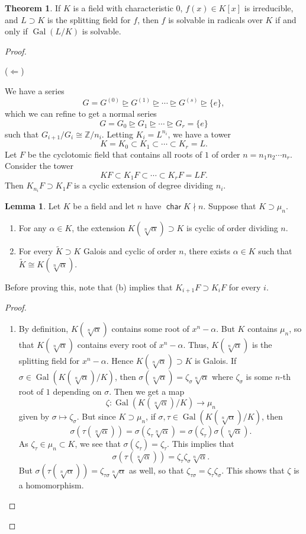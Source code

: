 \documentclass[10pt,letterpaper,cm]{nupset}
\theoremstyle{definition}
\theoremstyle{theorem}
\newtheorem{theorem}[definition]{Theorem}
\newtheorem{lemma}[definition]{Lemma}
\theoremstyle{remark}
\newcommand{\Z}{\mathbb Z}
\newcommand{\1}{\mathbf{1}}
\newcommand{\0}{\vec 0}
\DeclareMathOperator{\Char}{\mathsf{char}}
\DeclareMathOperator{\gal}{Gal}
\begin{document}
\begin{theorem}
If $K$ is a field with characteristic $0$, $f(x) \in K[x]$ is irreducible, and $L \supset K$ is the splitting field for $f$, then  $f$ is solvable in radicals over $K$ if and only if $\gal(L/K)$ is solvable. 
\end{theorem}
\begin{proof} $ $


($\Longleftarrow$) 

We have a series $$ G = G^{(0)} \unrhd G^{(1)} \unrhd \cdots \unrhd G^{(s)} \unrhd \{e\} ,$$ which we can refine to get a normal series $$  G=G_0 \unrhd G_1 \unrhd \cdots \unrhd G_r = \{e\}  $$ such that $G_{i+1}/G_i \cong \Z/n_i$. Letting $K_i = L^{n_i}$, we have a tower $$ K= K_0 \subset K_1 \subset \cdots \subset K_r = L  .$$ Let $F$ be the cyclotomic field that contains all roots of $1$ of order $n= n_1n_2 \cdots n_r$. Consider the tower $$KF \subset K_1F \subset \cdots \subset K_r F = LF.$$  Then $K_{n_i}F \supset K_1F$ is a cyclic extension of degree dividing $n_i$.
\begin{lemma}
Let $K$ be a field and let $n$ have $\Char{K} \nmid n$. Suppose that $K \supset \mu_n$.
\begin{enumerate}[label=(\alph*)]
\item For any $\alpha \in K$, the extension $K(\sqrt[n]{\alpha}) \supset K$  is cyclic of order dividing $n$.
\item For every $\widetilde{K} \supset K$ Galois and cyclic of order $n$, there exists $\alpha \in K$ such that $\widetilde{K} \cong K(\sqrt[n]{\alpha})$.
\end{enumerate}
\end{lemma}
Before proving this, note that (b) implies that $K_{i+1}F \supset K_iF$ for every $i$.
\begin{proof} $ $
\begin{enumerate}[label=(\alph*)]
\item By definition, $K(\sqrt[n]{\alpha})$ contains some root of $x^n - \alpha$. But $K$ contains $\mu_n$, so that $K(\sqrt[n]{\alpha})$ contains every root of $x^n - \alpha$. Thus, $K(\sqrt[n]{\alpha})$ is the splitting field for $x^n - \alpha$. Hence $K(\sqrt[n]{\alpha}) \supset K$ is Galois.
 If $\sigma \in \gal(K(\sqrt[n]{\alpha}) / K)$, then $ \sigma(\sqrt[n]{\alpha}) = \zeta_{\sigma} \sqrt[n]{\alpha}$ where $ \zeta_{\sigma}$ is  some  $n$-th root of $1$ depending on  $\sigma$. Then we get a map $$\zeta : \gal(K(\sqrt[n]{\alpha})/K) \to \mu_n$$ given by $ \sigma \mapsto \zeta_{\sigma}$. But since $K \supset \mu_n$, if $\sigma, \tau \in \gal(K(\sqrt[n]{\alpha})/K)$, then $$\sigma(\tau(\sqrt[n]{\alpha})) = \sigma(\zeta_{\tau}\sqrt[n]{\alpha})= \sigma(\zeta_{\tau})\sigma(\sqrt[n]{\alpha}).$$ As $\zeta_{\tau} \in \mu_n \subset K$, we see that $\sigma(\zeta_{\tau}) = \zeta_{\tau}$. This implies that $$ \sigma(\tau(\sqrt[n]{\alpha})) =  \zeta_{\tau}\zeta_{\sigma}\sqrt[n]{\alpha} .$$ But $\sigma(\tau(\sqrt[n]{\alpha})) = \zeta_{\tau \sigma}\sqrt[n]{\alpha}$ as well, so that $\zeta_{\tau \sigma} = \zeta_{\tau} \zeta_{\sigma}$. This shows that $\zeta$ is a homomorphism. 
 

\end{enumerate}
\end{proof}
\end{proof}
\end{document}

